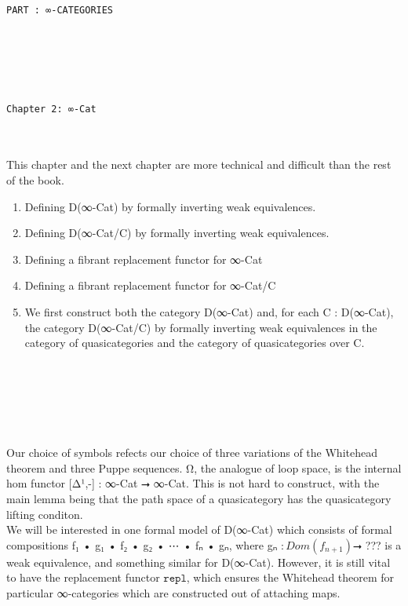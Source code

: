 \documentclass{book}
\theoremstyle{definition}
\newcounter{pcounter}
\newcounter{sectioncount}
\newcounter{subsectioncount}
\renewcommand{\section}[1]{\newpage\ \\ \ \\ \begin{center} \scalebox{1.5}{\texttt{\thesectioncount . #1}} \stepcounter{sectioncount} \setcounter{subsectioncount}{1} \end{center} \begin{center} \ \\ \ \\ \thispagestyle{empty} \end{center}}
\renewcommand{\chapter}[1]{
\newpage
{
\Huge 
\begin{center}
\ \\
\ \\
\thispagestyle{empty}
\texttt{#1}
\end{center}}
\ \\
\ \\
}
\newcounter{partcount}
\renewcommand{\part}[1]{
\newpage
{
\Huge 
\begin{center}
\ \\
\ \\
\ \\
\ \\
\ \\
\ \\
\thispagestyle{empty}
\texttt{PART {\thepartcount}: #1}
\stepcounter{partcount}
\end{center}}
\ \\
\ \\
}
\begin{document}
\part{∞-CATEGORIES}


\chapter{Chapter 2: ∞\texttt{-Cat}}

This chapter and the next chapter are more technical and difficult than the rest of the book.\\

\begin{enumerate}
\item Defining D(∞-Cat) by formally inverting weak equivalences.

\item Defining D(∞-Cat/C) by formally inverting weak equivalences.
\item Defining a fibrant replacement functor for ∞-Cat
\item Defining a fibrant replacement functor for ∞-Cat/C
\item We first construct both the category D(∞-Cat) and, for each C : D(∞-Cat), the category D(∞-Cat/C) by formally inverting weak equivalences in the category of quasicategories and the category of quasicategories over C.
\end{enumerate}


\section{Ω⃗}

Our choice of symbols refects our choice of three variations of the Whitehead theorem and three Puppe sequences. Ω⃗, the analogue of loop space, is the internal hom functor [Δ¹,-] : ∞-Cat ⭢ ∞-Cat. This is not hard to construct, with the main lemma being that the path space of a quasicategory has the quasicategory lifting conditon.\\

We will be interested in one formal model of D(∞-Cat) which consists of formal compositions f₁ • g₁ • f₂ • g₂ • ⋯ • fₙ • gₙ, where gₙ $: Dom(f{}_{n+1}) $⭢ ??? is a weak equivalence, and something similar for D(∞-Cat). However, it is still vital to have the replacement functor $\texttt{repl}$, which ensures the Whitehead theorem for particular ∞-categories which are constructed out of attaching maps.\\
\end{document}
